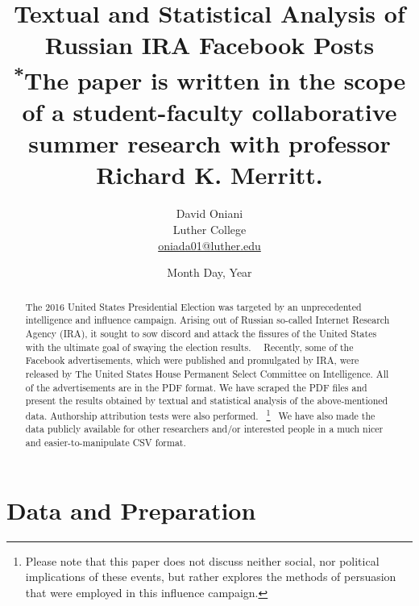 \documentclass[12pt]{article}
\author{David Oniani\\
        Luther College\\
        \href{mailto:oniada01@luther.edu}{oniada01@luther.edu}}
\title{\textbf{Textual and Statistical Analysis of Russian IRA Facebook Posts}\\
      \small \textsuperscript{*}The paper is written in the scope of a student-faculty collaborative\\
                                summer research with professor Richard K. Merritt.}
\date{Month Day, Year}
\theoremstyle{definition}
\begin{document}
\maketitle


\begin{abstract}

\noindent The 2016 United States Presidential Election was targeted by an
unprecedented intelligence and influence campaign. Arising out of Russian
so-called Internet Research Agency (IRA), it sought to sow discord and attack
the fissures of the United States with the ultimate goal of swaying the
election results.~\cite{ira2016}~\cite{ira2016data} Recently, some of the
Facebook advertisements, which were published and promulgated by IRA, were
released by The United States House Permanent Select Committee on Intelligence.
All of the advertisements are in the PDF format. We have scraped the PDF files
and present the results obtained by textual and statistical analysis of the
above-mentioned data. Authorship attribution tests were also performed.
~\footnote{Please note that this paper does not discuss neither social, nor
political implications of these events, but rather explores the methods of
persuasion that were employed in this influence campaign.}~\cite{ira2016csvdata}
We have also made the data publicly available for other researchers and/or
interested people in a much nicer and easier-to-manipulate CSV format.
\end{abstract}


\newpage
\tableofcontents
\newpage


\section*{\centering Data and Preparation}
\end{document}
